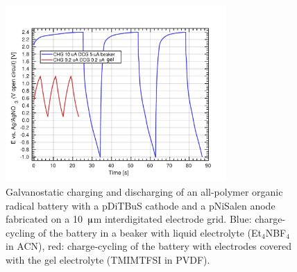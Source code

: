 \begin{figure}[h]
\center
	\includegraphics[width=0.75\textwidth]{./materials/figures/FETA_PVDF_GCD.pdf}
	\caption{Galvanostatic charging and discharging of an all-polymer organic radical battery with a pDiTBuS cathode and a pNiSalen anode fabricated on a 10~$\muup$m interdigitated electrode grid. Blue: charge-cycling of the battery in a beaker with liquid electrolyte (Et$_4$NBF$_4$ in ACN), red: charge-cycling of the battery with electrodes covered with the gel electrolyte (TMIMTFSI in PVDF).}
	\label{fig:transistor_battery_GCD}
\end{figure}

